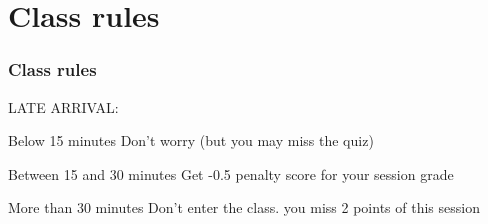 \documentclass[aspectratio=169,15pt]{beamer}
\begin{document}
\section{Class rules}
\begin{frame}
    \frametitle{Class rules}

    LATE ARRIVAL:
    {
        \begin{block}{Below 15 minutes}
            Don’t worry (but you may miss the quiz)
        \end{block}
    }
    {
        \begin{block}{Between 15 and 30 minutes}
            Get \alert{-0.5} penalty score for your session grade
        \end{block}
    }
    \begin{alertblock}{More than 30 minutes}
        Don’t enter the class. you miss \alert{2} points of this session
    \end{alertblock}

\end{frame}
\end{document}
